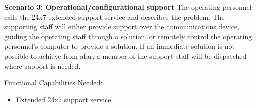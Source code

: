 \vspace{20pt}
\noindent \textbf{Scenario 3: Operational/configurational support}
The operating personnel calls the 24x7 extended support service and describes the problem. The supporting staff will either provide support over the communications device, guiding the operating staff through a solution, or remotely control the operating personnel’s computer to provide a solution. If an immediate solution is not possible to achieve from afar, a member of the support staff will be dispatched where support is needed. 

\noindent Functional Capabilities Needed:
\begin{itemize}
	\item Extended 24x7 support service
\end{itemize}













